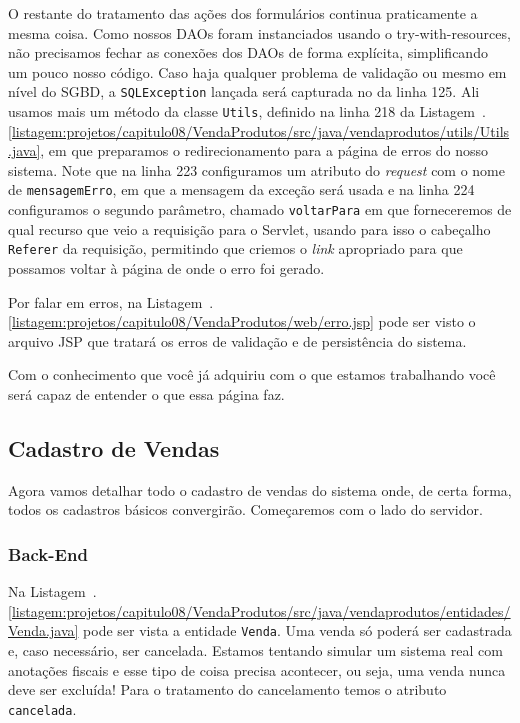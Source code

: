 O restante do tratamento das ações dos formulários continua praticamente a mesma coisa. Como nossos DAOs foram instanciados usando o try-with-resources, não precisamos fechar as conexões dos DAOs de forma explícita, simplificando um pouco nosso código. Caso haja qualquer problema de validação ou mesmo em nível do SGBD, a \texttt{SQLException} lançada será capturada no  da linha 125. Ali usamos mais um método da classe \texttt{Utils}, definido na linha 218 da Listagem~\thechapter.\ref{listagem:projetos/capitulo08/VendaProdutos/src/java/vendaprodutos/utils/Utils.java}, em que preparamos o redirecionamento para a página de erros do nosso sistema. Note que na linha 223 configuramos um atributo do \textit{request} com o nome de \texttt{mensagemErro}, em que a mensagem da exceção será usada e na linha 224 configuramos o segundo parâmetro, chamado \texttt{voltarPara} em que forneceremos de qual recurso que veio a requisição para o Servlet, usando para isso o cabeçalho \texttt{Referer} da requisição, permitindo que criemos o \textit{link} apropriado para que possamos voltar à página de onde o erro foi gerado.

Por falar em erros, na Listagem~\thechapter.\ref{listagem:projetos/capitulo08/VendaProdutos/web/erro.jsp} pode ser visto o arquivo JSP que tratará os erros de validação e de persistência do sistema.


Com o conhecimento que você já adquiriu com o que estamos trabalhando você será capaz de entender o que essa página faz.


\subsection{Cadastro de Vendas}

Agora vamos detalhar todo o cadastro de vendas do sistema onde, de certa forma, todos os cadastros básicos convergirão. Começaremos com o lado do servidor.

\subsubsection{Back-End}

Na Listagem~\thechapter.\ref{listagem:projetos/capitulo08/VendaProdutos/src/java/vendaprodutos/entidades/Venda.java} pode ser vista a entidade \texttt{Venda}. Uma venda só poderá ser cadastrada e, caso necessário, ser cancelada. Estamos tentando simular um sistema real com anotações fiscais e esse tipo de coisa precisa acontecer, ou seja, uma venda nunca deve ser excluída! Para o tratamento do cancelamento temos o atributo \texttt{cancelada}.

